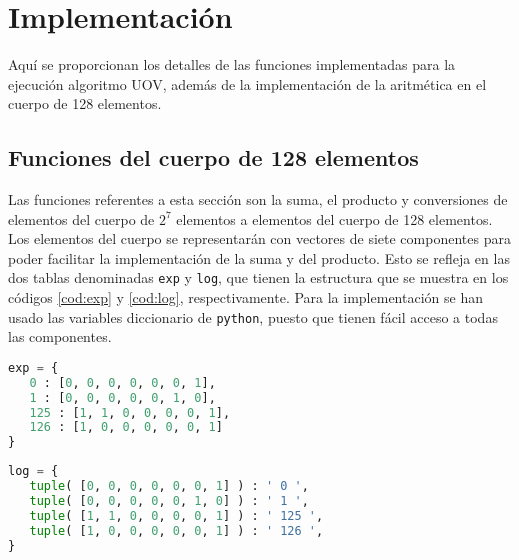 \chapter{Implementación}
\label{sec:implementacion}

Aquí se proporcionan los detalles de las funciones implementadas para la ejecución algoritmo UOV, además de la implementación de la aritmética en el cuerpo de 128 elementos.\\

\section{Funciones del cuerpo de 128 elementos}
Las funciones referentes a esta sección son la suma, el producto y conversiones de elementos del cuerpo de $2^7$ elementos a elementos del cuerpo de 128 elementos.\\

Los elementos del cuerpo se representarán con vectores de siete componentes para poder facilitar la implementación de la suma y del producto. Esto se refleja en las dos tablas denominadas \texttt{exp} y \texttt{log}, que tienen la estructura que se muestra en los códigos \ref{cod:exp} y \ref{cod:log}, respectivamente. Para la implementación se han usado las variables diccionario de \texttt{python}, puesto que tienen fácil acceso a todas las componentes.

\vspace{0.25cm}

\begin{lstlisting}[language=Python,caption=Tabla para calcular la potencia en el cuerpo, label=cod:exp]
exp = {
   0 : [0, 0, 0, 0, 0, 0, 1],
   1 : [0, 0, 0, 0, 0, 1, 0],
   125 : [1, 1, 0, 0, 0, 0, 1],
   126 : [1, 0, 0, 0, 0, 0, 1]
}

\end{lstlisting}

\begin{lstlisting}[language=Python,caption=Tabla para calcular el logaritmo en el cuerpo, label=cod:log]
log = {
   tuple( [0, 0, 0, 0, 0, 0, 1] ) : ' 0 ',
   tuple( [0, 0, 0, 0, 0, 1, 0] ) : ' 1 ',
   tuple( [1, 1, 0, 0, 0, 0, 1] ) : ' 125 ',
   tuple( [1, 0, 0, 0, 0, 0, 1] ) : ' 126 ',
}
\end{lstlisting}

